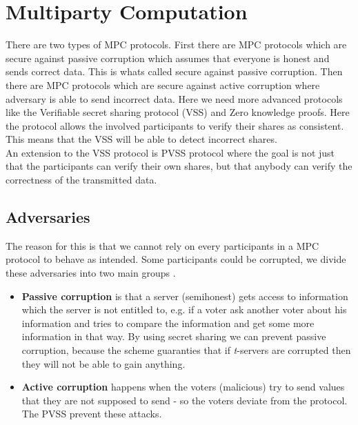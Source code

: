 \section{Multiparty Computation}
There are two types of MPC protocols. First there are MPC protocols which are secure against passive corruption which assumes that everyone is honest and sends correct data. This is whats called secure against passive corruption. Then there are MPC protocols which are secure against active corruption where adversary is able to send incorrect data. Here we need more advanced protocols like the Verifiable secret sharing protocol (VSS) and Zero knowledge proofs. Here the protocol allows the involved participants to verify their shares as consistent. This means that the VSS will be able to detect incorrect shares. \\

\noindent
An extension to the VSS protocol is PVSS protocol where the goal is not just that the participants can verify their own shares, but that anybody can verify the correctness of the transmitted data. 

\subsection{Adversaries}
The reason for this is that we cannot rely on every participants in a MPC protocol to behave as intended. Some participants could be corrupted, we divide these adversaries into two main groups \cite{IntroCrypto}. 

\begin{itemize}
\item \textbf{Passive corruption} is that a server (semihonest) gets access to information which the server is not entitled to, e.g. if a voter ask another voter about his information and tries to compare the information and get some more information in that way. By using secret sharing we can prevent passive corruption, because the scheme guaranties that if \textit{t}-servers are corrupted then they will not be able to gain anything.

\item \textbf{Active corruption} happens when the voters (malicious) try to send values that they are not supposed to send - so the voters deviate from the protocol. The PVSS prevent these attacks.
\end{itemize}
